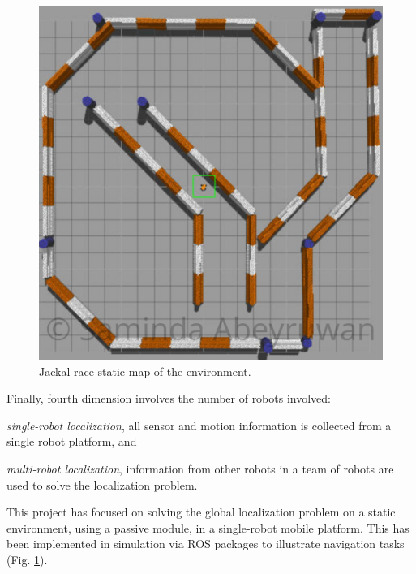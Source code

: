 \documentclass[10pt,journal,compsoc]{IEEEtran}
\begin{document}
\begin{figure}[thpb]
      \centering
      \includegraphics[width=\linewidth]{misc/map_w.png}
      \caption{Jackal race static map of the environment.}
      \label{fig:map}
\end{figure}

Finally, fourth dimension involves the number of robots involved: \begin{enumerate*} \item \textit{single-robot localization}, all sensor and motion information is collected from a single robot platform, and \item \textit{multi-robot localization}, information from other robots in a team of robots are used to solve the localization problem. \end{enumerate*}

This project has focused on solving the global localization problem on a static environment, using a passive module, in a single-robot mobile platform. This has been implemented in simulation via ROS \cite{288} packages to illustrate navigation tasks (Fig. \ref{fig:map}).  


\end{document}
